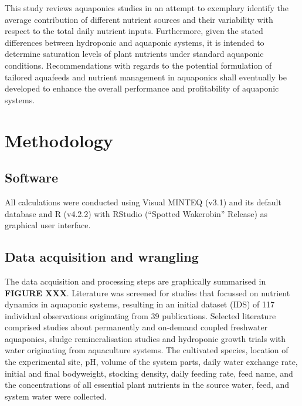\documentclass[
]{article}
\begin{document}
This study reviews aquaponics studies in an attempt to exemplary identify the average contribution of different nutrient sources and their variability with respect to the total daily nutrient inputs. Furthermore, given the stated differences between hydroponic and aquaponic systems, it is intended to determine saturation levels of plant nutrients under standard aquaponic conditions. Recommendations with regards to the potential formulation of tailored aquafeeds and nutrient management in aquaponics shall eventually be developed to enhance the overall performance and profitability of aquaponic systems.

\hypertarget{methodology}{%
\section{Methodology}\label{methodology}}

\hypertarget{software}{%
\subsection{Software}\label{software}}

All calculations were conducted using Visual MINTEQ (v3.1) and its default database and R (v4.2.2) with RStudio (``Spotted Wakerobin'' Release) as graphical user interface.

\hypertarget{data-acquisition-and-wrangling}{%
\subsection{Data acquisition and wrangling}\label{data-acquisition-and-wrangling}}

The data acquisition and processing steps are graphically summarised in \textbf{FIGURE XXX}. Literature was screened for studies that focussed on nutrient dynamics in aquaponic systems, resulting in an initial dataset (IDS) of 117 individual observations originating from 39 publications. Selected literature comprised studies about permanently and on-demand coupled freshwater aquaponics, sludge remineralisation studies and hydroponic growth trials with water originating from aquaculture systems. The cultivated species, location of the experimental site, pH, volume of the system parts, daily water exchange rate, initial and final bodyweight, stocking density, daily feeding rate, feed name, and the concentrations of all essential plant nutrients in the source water, feed, and system water were collected.
\end{document}
